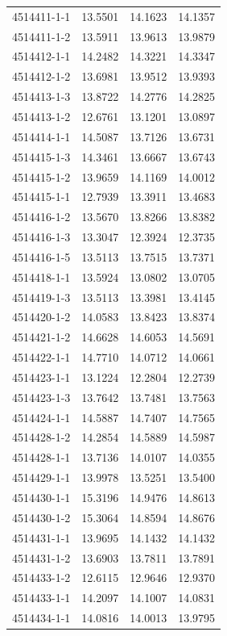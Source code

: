 \begin{longtable}{lrrr}
4514411-1-1 & 13.5501 & 14.1623 & 14.1357 \\
4514411-1-2 & 13.5911 & 13.9613 & 13.9879 \\
4514412-1-1 & 14.2482 & 14.3221 & 14.3347 \\
4514412-1-2 & 13.6981 & 13.9512 & 13.9393 \\
4514413-1-3 & 13.8722 & 14.2776 & 14.2825 \\
4514413-1-2 & 12.6761 & 13.1201 & 13.0897 \\
4514414-1-1 & 14.5087 & 13.7126 & 13.6731 \\
4514415-1-3 & 14.3461 & 13.6667 & 13.6743 \\
4514415-1-2 & 13.9659 & 14.1169 & 14.0012 \\
4514415-1-1 & 12.7939 & 13.3911 & 13.4683 \\
4514416-1-2 & 13.5670 & 13.8266 & 13.8382 \\
4514416-1-3 & 13.3047 & 12.3924 & 12.3735 \\
4514416-1-5 & 13.5113 & 13.7515 & 13.7371 \\
4514418-1-1 & 13.5924 & 13.0802 & 13.0705 \\
4514419-1-3 & 13.5113 & 13.3981 & 13.4145 \\
4514420-1-2 & 14.0583 & 13.8423 & 13.8374 \\
4514421-1-2 & 14.6628 & 14.6053 & 14.5691 \\
4514422-1-1 & 14.7710 & 14.0712 & 14.0661 \\
4514423-1-1 & 13.1224 & 12.2804 & 12.2739 \\
4514423-1-3 & 13.7642 & 13.7481 & 13.7563 \\
4514424-1-1 & 14.5887 & 14.7407 & 14.7565 \\
4514428-1-2 & 14.2854 & 14.5889 & 14.5987 \\
4514428-1-1 & 13.7136 & 14.0107 & 14.0355 \\
4514429-1-1 & 13.9978 & 13.5251 & 13.5400 \\
4514430-1-1 & 15.3196 & 14.9476 & 14.8613 \\
4514430-1-2 & 15.3064 & 14.8594 & 14.8676 \\
4514431-1-1 & 13.9695 & 14.1432 & 14.1432 \\
4514431-1-2 & 13.6903 & 13.7811 & 13.7891 \\
4514433-1-2 & 12.6115 & 12.9646 & 12.9370 \\
4514433-1-1 & 14.2097 & 14.1007 & 14.0831 \\
4514434-1-1 & 14.0816 & 14.0013 & 13.9795 \\

\end{longtable}
